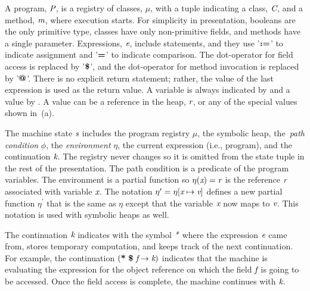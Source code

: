 A program, $\emph{P}$, is a registry of classes, $\mu$, with
a tuple indicating a class, $\emph{C}$, and a method, $\emph{m}$,
where execution starts. For simplicity in presentation, booleans are the only primitive type, 
classes have only non-primitive fields, and methods have a single
parameter. Expressions, $\emph{e}$, include statements, and they use
'$\textbf{:=}$' to indicate assignment and '$\textbf{=}$' to indicate
comparison.  The dot-operator for field access is replaced by
'$\textbf{\$}$', and the dot-operator for method invocation is replaced
by '$\textbf{@}$'. There is no
explicit return statement; rather, the value of the last expression is
used as the return value. A variable is always indicated by 
and a value by . A value can be a reference in the heap,
$\emph{r}$, or any of the special values shown
in~(a).  

The machine state $\emph{s}$ includes the program
registry $\mu$, the symbolic heap, the~\emph{path condition} $\phi$, the \emph{environment} $\eta$, the current expression (i.e., program), and the continuation $\emph{k}$. The registry never changes so it is
omitted from the state tuple in the rest of the presentation. The path condition is a predicate of the program variables. 
The environment is a partial function so $\eta(\emph{x}) = \emph{r}$ is the reference
$\emph{r}$ associated with variable $\emph{x}$. The notation
$\eta^\prime = \eta[\emph{x} \mapsto \emph{v}]$ defines a new
partial function $\eta^\prime$ that is the same as $\eta$ except that
the variable $\emph{x}$ now maps to $\emph{v}$. This notation is used with symbolic heaps as well. 

The continuation
$\emph{k}$ indicates with the symbol $\emph{*}$ where the expression $\emph{e}$ came from, stores
temporary computation, and keeps track of the next continuation. For
example, the continuation $(\textbf{*}\ \textbf{\$}\ \emph{f}
\rightarrow \emph{k})$ indicates that the machine is evaluating the
expression for the object reference on which the field $\emph{f}$ is
going to be accessed. Once the field access is complete, the machine
continues with $\emph{k}$.  

